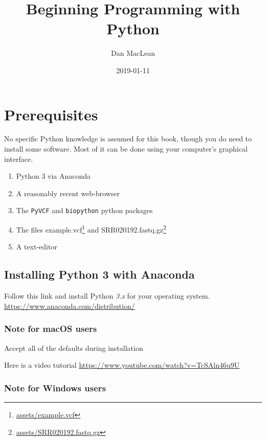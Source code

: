 \documentclass[]{book}
\title{Beginning Programming with Python}
\author{Dan MacLean}
\date{2019-01-11}
\providecommand{\tightlist}{%
  \setlength{\itemsep}{0pt}\setlength{\parskip}{0pt}}
\let\rmarkdownfootnote\footnote%
\def\footnote{\protect\rmarkdownfootnote}
\renewcommand{\href}[2]{#2\footnote{\url{#1}}}
\theoremstyle{definition}
\theoremstyle{definition}
\theoremstyle{definition}
\theoremstyle{remark}
\begin{document}
\maketitle

{
\setcounter{tocdepth}{1}
\tableofcontents
}
\hypertarget{prerequisites}{%
\chapter{Prerequisites}\label{prerequisites}}

No specific Python knowledge is assumed for this book, though you do
need to install some software. Most of it can be done using your
computer's graphical interface.

\begin{enumerate}
\def\labelenumi{\arabic{enumi}.}
\tightlist
\item
  Python 3 via Anaconda
\item
  A reasonably recent web-browser
\item
  The \texttt{PyVCF} and \texttt{biopython} python packages
\item
  The files \href{assets/example.vcf}{example.vcf} and
  \href{assets/SRR020192.fastq.gz}{SRR020192.fastq.gz}
\item
  A text-editor
\end{enumerate}

\hypertarget{installing-python-3-with-anaconda}{%
\section{Installing Python 3 with
Anaconda}\label{installing-python-3-with-anaconda}}

Follow this link and install Python \emph{3.x} for your operating
system. \url{https://www.anaconda.com/distribution/}

\hypertarget{note-for-macos-users}{%
\subsection{Note for macOS users}\label{note-for-macos-users}}

Accept all of the defaults during installation

Here is a video tutorial
\url{https://www.youtube.com/watch?v=TcSAln46u9U}

\hypertarget{note-for-windows-users}{%
\subsection{Note for Windows users}\label{note-for-windows-users}}
\end{document}
